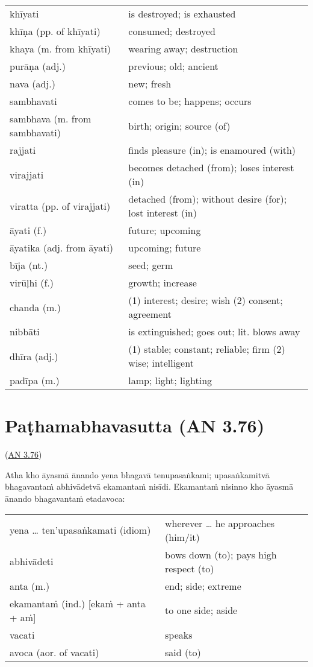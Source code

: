 \documentclass[11pt,oneside]{memoir}
\begin{document}
\begin{longtable}{L{\colOne} L{\colTwo}}
khīyati & is destroyed; is exhausted\\[0pt]
khīṇa (pp. of khīyati) & consumed; destroyed\\[0pt]
khaya (m. from khīyati) & wearing away; destruction\\[0pt]
purāṇa (adj.) & previous; old; ancient\\[0pt]
nava (adj.) & new; fresh\\[0pt]
sambhavati & comes to be; happens; occurs\\[0pt]
sambhava (m. from sambhavati) & birth; origin; source (of)\\[0pt]
rajjati & finds pleasure (in); is enamoured (with)\\[0pt]
virajjati & becomes detached (from); loses interest (in)\\[0pt]
viratta (pp. of virajjati) & detached (from); without desire (for); lost interest (in)\\[0pt]
āyati (f.) & future; upcoming\\[0pt]
āyatika (adj. from āyati) & upcoming; future\\[0pt]
bīja (nt.) & seed; germ\\[0pt]
virūḷhi (f.) & growth; increase\\[0pt]
chanda (m.) & (1) interest; desire; wish (2) consent; agreement\\[0pt]
nibbāti & is extinguished; goes out; lit. blows away\\[0pt]
dhīra (adj.) & (1) stable; constant; reliable; firm (2) wise; intelligent\\[0pt]
padīpa (m.) & lamp; light; lighting\\[0pt]
\end{longtable}

\chapter{Paṭhamabhavasutta (AN 3.76)}
\label{sec:org84a96d7}

(\href{https://suttacentral.net/an3.76/pli/ms}{AN 3.76})

\begin{spacedquote}
Atha kho āyasmā ānando yena bhagavā tenupasaṅkami; upasaṅkamitvā bhagavantaṁ
abhivādetvā ekamantaṁ nisīdi. Ekamantaṁ nisinno kho āyasmā ānando bhagavantaṁ
etadavoca:
\end{spacedquote}

\begin{longtable}{L{\colOne} L{\colTwo}}
yena \ldots{} ten'upasaṅkamati (idiom) & wherever \ldots{} he approaches (him/it)\\[0pt]
abhivādeti & bows down (to); pays high respect (to)\\[0pt]
anta (m.) & end; side; extreme\\[0pt]
ekamantaṁ (ind.) [ekaṁ + anta + aṁ] & to one side; aside\\[0pt]
vacati & speaks\\[0pt]
avoca (aor. of vacati) & said (to)\\[0pt]
\end{longtable}
\end{document}
